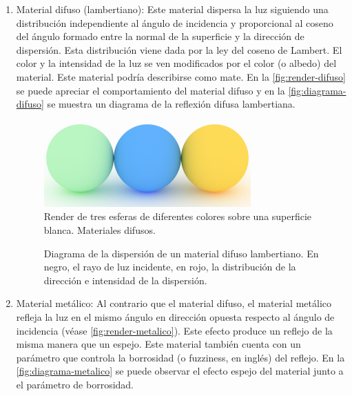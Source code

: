 \documentclass[10pt, a4paper]{article}
\begin{document}
\begin{enumerate}
    
\item Material difuso (lambertiano): Este material dispersa la luz siguiendo una distribución independiente al ángulo de incidencia y proporcional al coseno del ángulo formado entre la normal de la superficie y la dirección de dispersión. Esta distribución viene dada por la ley del coseno de Lambert. El color y la intensidad de la luz se ven modificados por el color (o albedo) del material. Este material podría describirse como mate. En la \autoref{fig:render-difuso} se puede apreciar el comportamiento del material difuso y en la \autoref{fig:diagrama-difuso} se muestra un diagrama de la reflexión difusa lambertiana.

\begin{figure}[H]
    \centering 
    \includegraphics[width=0.75\textwidth]{02_crop}
    \caption{Render de tres esferas de diferentes colores sobre una superficie blanca. Materiales difusos.}
    \label{fig:render-difuso}
\end{figure}

\begin{figure}[H]
    \centering 
    
    \caption{Diagrama de la dispersión de un material difuso lambertiano. En negro, el rayo de luz incidente, en rojo, la distribución de la dirección e intensidad de la dispersión.}
    \label{fig:diagrama-difuso}
\end{figure}

\item Material metálico: Al contrario que el material difuso, el material metálico refleja la luz en el mismo ángulo en dirección opuesta respecto al ángulo de incidencia (véase \autoref{fig:render-metalico}). Este efecto produce un reflejo de la misma manera que un espejo. Este material también cuenta con un parámetro que controla la borrosidad (o fuzziness, en inglés) del reflejo. En la \autoref{fig:diagrama-metalico} se puede observar el efecto espejo del material junto a el parámetro de borrosidad.


\end{enumerate}
\end{document}
